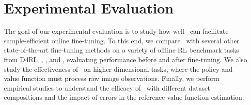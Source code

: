 \vspace{-0.09cm}
\section{Experimental Evaluation}
\vspace{-0.22cm}
\label{sec:calql_experiments}
The goal of our experimental evaluation is to study how well \methodname\ can facilitate sample-efficient online fine-tuning. To this end, we compare \methodname\ with several other state-of-the-art fine-tuning methods on a variety of offline RL benchmark tasks from D4RL~\cite{fu2020d4rl}, \citet{singh2020cog}, and \citet{nair2020accelerating}, evaluating performance before and after fine-tuning. We also study the effectiveness of \methodname\ on higher-dimensional tasks, where the policy and value function must process raw image observations. Finally, we perform empirical studies to understand the efficacy of \methodname\ with different dataset compositions and the impact of errors in the reference value function estimation.

